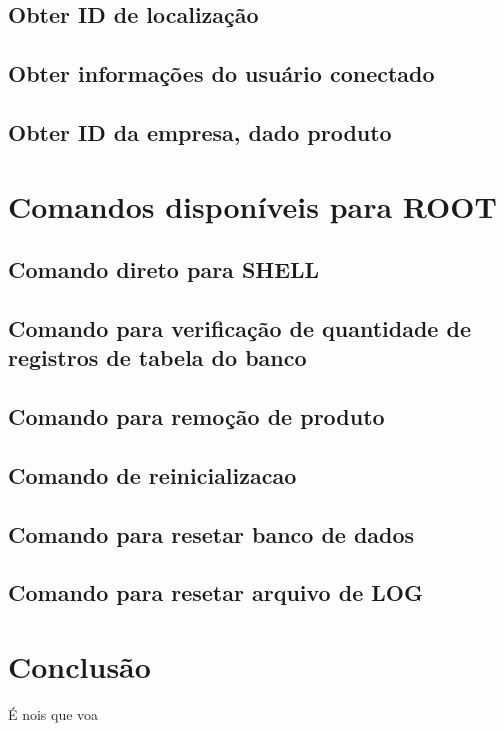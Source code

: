 \documentclass{article}
\begin{document}
		\subsection{Obter ID de localização}
		\subsection{Obter informações do usuário conectado}
		\subsection{Obter ID da empresa, dado produto}
	\section{Comandos disponíveis para ROOT}
		\subsection{Comando direto para SHELL}
		\subsection{Comando para verificação de quantidade de registros de tabela do banco}
		\subsection{Comando para remoção de produto}
		\subsection{Comando de reinicializacao}
		\subsection{Comando para resetar banco de dados}
		\subsection{Comando para resetar arquivo de LOG}
	\section{Conclusão}\indent
	\par É nois que voa
\end{document}
